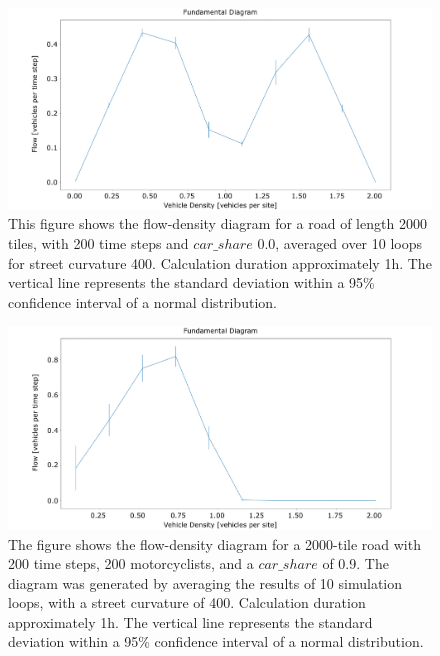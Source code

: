 \begin{figure}
	\centering
	\includegraphics[width=0.8\linewidth]{images/flow_density401_full_bike.png}
	\caption{This figure shows the flow-density diagram for a road of length 2000 tiles, with 200 time steps and $car\_share$ 0.0, averaged over 10 loops for street curvature 400. Calculation duration approximately 1h. The vertical line represents the standard deviation within a 95\% confidence interval of a normal distribution.}
	\label{fig:flow_density401_full_bike}
\end{figure}

\begin{figure}
    \centering
    \includegraphics[width=0.8\linewidth]{images/flow_density401_more_bikers.png}
    \caption{The figure shows the flow-density diagram for a 2000-tile road with 200 time steps, 200 motorcyclists, and a $car\_share$ of 0.9. The diagram was generated by averaging the results of 10 simulation loops, with a street curvature of 400. Calculation duration approximately 1h. The vertical line represents the standard deviation within a 95\% confidence interval of a normal distribution.}
    \label{fig:flow_density401_more_bikers.png}
\end{figure}





